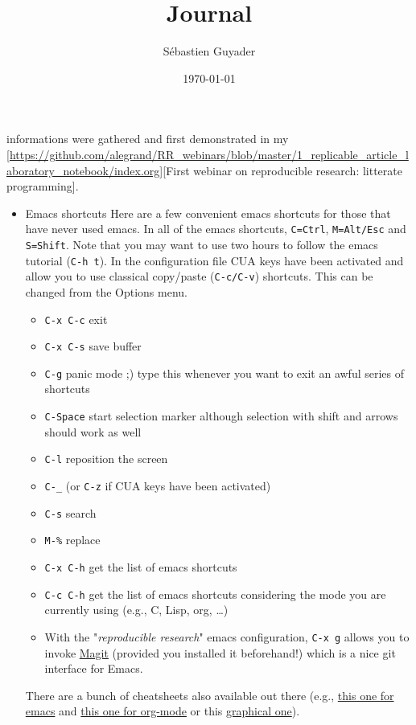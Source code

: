 \documentclass[a4paper]{article}
\author{Sébastien Guyader}
\date{\today}
\title{Journal}
\begin{document}
\maketitle
\tableofcontents

informations were gathered and first demonstrated in my [\url{https://github.com/alegrand/RR\_webinars/blob/master/1\_replicable\_article\_laboratory\_notebook/index.org}][First
webinar on reproducible research: litterate programming].
\begin{itemize}
\item Emacs shortcuts
\label{sec:org06aa019}
Here are a few convenient emacs shortcuts for those that have never
used emacs. In all of the emacs shortcuts, \texttt{C=Ctrl}, \texttt{M=Alt/Esc} and
\texttt{S=Shift}.  Note that you may want to use two hours to follow the emacs
tutorial (\texttt{C-h t}). In the configuration file CUA keys have been
activated and allow you to use classical copy/paste (\texttt{C-c/C-v})
shortcuts. This can be changed from the Options menu.
\begin{itemize}
\item \texttt{C-x C-c} exit
\item \texttt{C-x C-s} save buffer
\item \texttt{C-g} panic mode ;) type this whenever you want to exit an awful
series of shortcuts
\item \texttt{C-Space} start selection marker although selection with shift and
arrows should work as well
\item \texttt{C-l} reposition the screen
\item \texttt{C-\_} (or \texttt{C-z} if CUA keys have been activated)
\item \texttt{C-s} search
\item \texttt{M-\%} replace
\item \texttt{C-x C-h} get the list of emacs shortcuts
\item \texttt{C-c C-h} get the list of emacs shortcuts considering the mode you are
currently using (e.g., C, Lisp, org, \ldots{})
\item With the "\emph{reproducible research}" emacs configuration, \texttt{C-x g} allows
you to invoke \href{https://magit.vc/}{Magit} (provided you installed it beforehand!) which
is a nice git interface for Emacs.
\end{itemize}
There are a bunch of cheatsheets also available out there (e.g.,
\href{http://www.shortcutworld.com/en/linux/Emacs\_23.2.1.html}{this one for emacs} and \href{http://orgmode.org/orgcard.txt}{this one for org-mode} or this \href{http://sachachua.com/blog/wp-content/uploads/2013/05/How-to-Learn-Emacs-v2-Large.png}{graphical one}).

\end{itemize}
\end{document}
